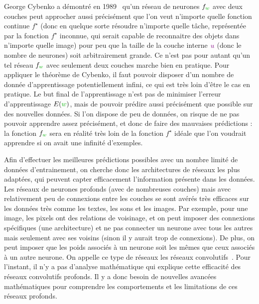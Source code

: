 George Cybenko a démontré en 1989~\cite{cybenko1989approximation} qu'un réseau de neurones $f_{\mygreen{w}}$ avec deux couches peut approcher aussi précisément que l'on veut n'importe quelle fonction continue $f^\star$ (donc en quelque sorte résoudre n'importe quelle tâche, représentée par la fonction $f^\star$ inconnue, qui serait capable de reconnaitre des objets dans n'importe quelle image) pour peu que la taille de la couche interne ${\color[rgb]{.5,0,.5} u}$ (donc le nombre de neurones) soit arbitrairement grande.
%
Ce n'est pas pour autant qu'un tel réseau $f_{\mygreen{w}}$ avec seulement deux couches marche bien en pratique. Pour appliquer le théorème de Cybenko, il faut pouvoir disposer d'un nombre de donnée d'apprentissage potentiellement infini, ce qui est très loin d'être le cas en pratique.
%
Le but final de l'apprentissage n'est pas de minimiser l'erreur d'apprentissage $E(\mygreen{w})$, mais de pouvoir prédire aussi précisément que possible sur des nouvelles données. Si l'on dispose de peu de données, on risque de ne pas pouvoir apprendre assez précisément, et donc de faire des mauvaises prédictions : la fonction $f_{\mygreen{w}}$ sera en réalité très loin de la fonction $f^\star$ idéale que l'on voudrait apprendre si on avait une infinité d'exemples.  

Afin d'effectuer les meilleures prédictions possibles avec un nombre limité de données d'entrainement, on cherche donc les architectures de réseaux les plus adaptées, qui peuvent capter efficacement l'information présente dans les données. 
%
Les réseaux de neurones profonds (avec de nombreuses couches) mais avec relativement peu de connexions entre les couches se sont avérés très efficaces sur les données très  comme les textes, les sons et les images. 
%
Par exemple, pour une image, les pixels ont des relations de voisinage, et on peut imposer des connexions spécifiques (une architecture) et ne pas connecter un neurone avec tous les autres mais seulement avec ses voisins (sinon il y aurait trop de connexions). De plus, on peut imposer que les poids associés à un neurone soit les mêmes que ceux associés à un autre neurone. On appelle ce type de réseaux les réseaux convolutifs~\cite{lecun1998gradient}. 
%
Pour l'instant, il n'y a pas d'analyse mathématique qui explique cette efficacité des réseaux convolutifs profonds. Il y a donc besoin de nouvelles avancées mathématiques pour comprendre les comportements et les limitations de ces réseaux profonds. 

